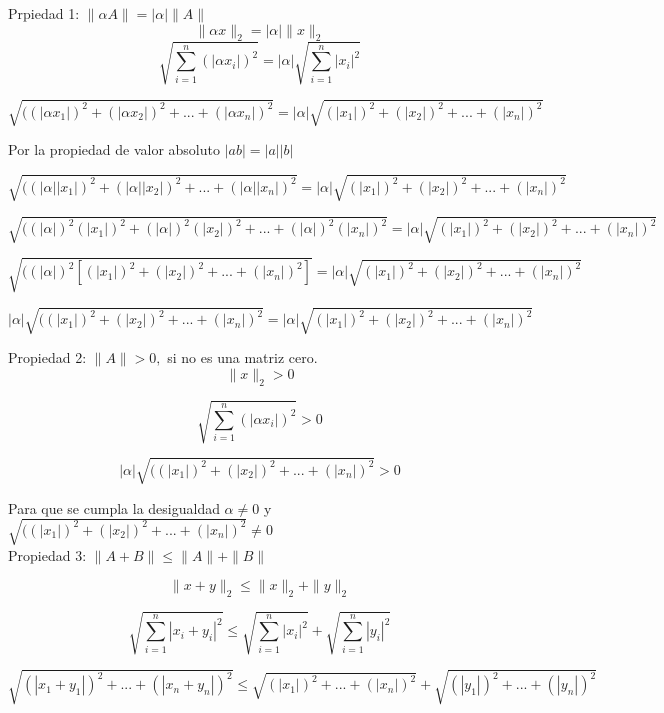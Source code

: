 \documentclass[12pt]{article}
\begin{document}
\begin{enumerate}
          Prpiedad 1: $\|\alpha A\| = |\alpha| \|A\|$
          \[ \|\alpha x\|_{2} = |\alpha| \|x\|_{2} \]
          \[ \sqrt{\sum_{i = 1}^{n} (|\alpha x_{i}|)^{2}} = |\alpha| \sqrt{\sum_{i = 1}^{n}|x_{i}|^{2}}\]
         
          \[\sqrt{((|\alpha x_{1}|)^{2} + (|\alpha x_{2}|)^{2} + ... + (|\alpha x_{n}|)^{2}}  =|\alpha| \sqrt{(|x_{1}|)^{2} + (|x_{2}|)^{2} + ... + (|x_{n}|)^{2}}\]
          
          Por la propiedad de valor absoluto $|ab|=|a||b|$
          
          \[\sqrt{((|\alpha| |x_{1}|)^{2} + (|\alpha| |x_{2}|)^{2} + ... + (|\alpha| |x_{n}|)^{2}}  =|\alpha| \sqrt{(|x_{1}|)^{2} + (|x_{2}|)^{2} + ... + (|x_{n}|)^{2}}\]
          
          \[\sqrt{((|\alpha|)^{2}( |x_{1}|)^{2} + (|\alpha|)^{2} (|x_{2}|)^{2} + ... + (|\alpha|)^{2} (|x_{n}|)^{2}}  =|\alpha| \sqrt{(|x_{1}|)^{2} + (|x_{2}|)^{2} + ... + (|x_{n}|)^{2}}\]
          
          \[\sqrt{((|\alpha|)^{2}[( |x_{1}|)^{2} + (|x_{2}|)^{2} + ... + (|x_{n}|)^{2}]}  =|\alpha| \sqrt{(|x_{1}|)^{2} + (|x_{2}|)^{2} + ... + (|x_{n}|)^{2}}\]
          
          \[|\alpha| \sqrt{(( |x_{1}|)^{2} + (|x_{2}|)^{2} + ... + (|x_{n}|)^{2}}  =|\alpha| \sqrt{(|x_{1}|)^{2} + (|x_{2}|)^{2} + ... + (|x_{n}|)^{2}}\]
          
          Propiedad 2: $\|A\| > 0 ,$ si no es una matriz cero.
          \[\|x\|_{2} > 0\]
          
          \[ \sqrt{\sum_{i = 1}^{n} (|\alpha x_{i}|)^{2}} > 0\]
          
          \[|\alpha| \sqrt{(( |x_{1}|)^{2} + (|x_{2}|)^{2} + ... + (|x_{n}|)^{2}}  > 0\]
          
          Para que se cumpla la desigualdad  $ \alpha \ne 0 $  y $\sqrt{(( |x_{1}|)^{2} + (|x_{2}|)^{2} + ... + (|x_{n}|)^{2}} \ne 0$\\
          
          Propiedad 3: $\|A + B\| \leq \|A\| +  \|B\|$
          
          \[ \|x + y\|_{2} \leq \|x\|_{2} +  \|y\|_{2} \]
          
          \[ \sqrt{\sum_{i = 1}^{n}|x_{i} + y_{i}|^{2} } \leq \sqrt{\sum_{i = 1}^{n}|x_{i}|^{2}} +  \sqrt{\sum_{i = 1}^{n}|y_{i}|^{2}}\]
          
          \[ \sqrt{(|x_{1} + y_{1}|)^{2}  + ... + (|x_{n} + y_{n}|)^{2}} \leq \sqrt{(|x_{1}|)^{2} + ... + (|x_{n}|)^{2}} + \sqrt{(|y_{1}|)^{2} + ... + (|y_{n}|)^{2}}\]
          

\end{enumerate}
\end{document}

